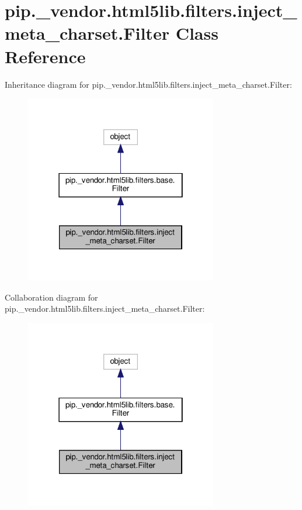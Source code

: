 \hypertarget{classpip_1_1__vendor_1_1html5lib_1_1filters_1_1inject__meta__charset_1_1Filter}{}\section{pip.\+\_\+vendor.\+html5lib.\+filters.\+inject\+\_\+meta\+\_\+charset.\+Filter Class Reference}
\label{classpip_1_1__vendor_1_1html5lib_1_1filters_1_1inject__meta__charset_1_1Filter}


Inheritance diagram for pip.\+\_\+vendor.\+html5lib.\+filters.\+inject\+\_\+meta\+\_\+charset.\+Filter\+:
\nopagebreak
\begin{figure}[H]
\begin{center}
\leavevmode
\includegraphics[width=238pt]{classpip_1_1__vendor_1_1html5lib_1_1filters_1_1inject__meta__charset_1_1Filter__inherit__graph}
\end{center}
\end{figure}


Collaboration diagram for pip.\+\_\+vendor.\+html5lib.\+filters.\+inject\+\_\+meta\+\_\+charset.\+Filter\+:
\nopagebreak
\begin{figure}[H]
\begin{center}
\leavevmode
\includegraphics[width=238pt]{classpip_1_1__vendor_1_1html5lib_1_1filters_1_1inject__meta__charset_1_1Filter__coll__graph}
\end{center}
\end{figure}

